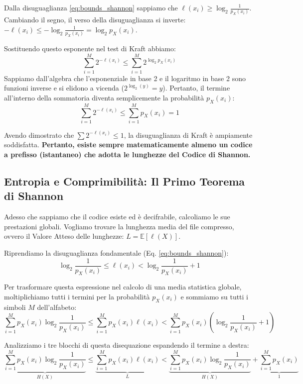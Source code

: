 Dalla disuguaglianza \ref{eq:bounds_shannon} sappiamo che $\ell(x_i) \ge \log_2 \frac{1}{p_X(x_i)}$. 
Cambiando il segno, il verso della disuguaglianza si inverte: 
$-\ell(x_i) \le -\log_2 \frac{1}{p_X(x_i)} = \log_2 p_X(x_i)$.

Sostituendo questo esponente nel test di Kraft abbiamo:
\begin{equation}
\sum_{i=1}^{M} 2^{-\ell(x_i)} \le \sum_{i=1}^{M} 2^{\log_2 p_X(x_i)}
\end{equation}
Sappiamo dall'algebra che l'esponenziale in base 2 e il logaritmo in base 2 sono funzioni inverse e si elidono a vicenda ($2^{\log_2(y)} = y$). Pertanto, il termine all'interno della sommatoria diventa semplicemente la probabilità $p_X(x_i)$:
\begin{equation}
\sum_{i=1}^{M} 2^{-\ell(x_i)} \le \sum_{i=1}^{M} p_X(x_i) = 1
\end{equation}

Avendo dimostrato che $\sum 2^{-\ell(x_i)} \le 1$, la disuguaglianza di Kraft è ampiamente soddisfatta. \textbf{Pertanto, esiste sempre matematicamente almeno un codice a prefisso (istantaneo) che adotta le lunghezze del Codice di Shannon.}

\subsection{Entropia e Comprimibilità: Il Primo Teorema di Shannon}

Adesso che sappiamo che il codice esiste ed è decifrabile, calcoliamo le sue prestazioni globali. Vogliamo trovare la lunghezza media del file compresso, ovvero il Valore Atteso delle lunghezze: $L = \mathbb{E}[\ell(X)]$.

Riprendiamo la disuguaglianza fondamentale (Eq. \ref{eq:bounds_shannon}):
\begin{equation*}
\log_2 \frac{1}{p_X(x_i)} \le \ell(x_i) < \log_2 \frac{1}{p_X(x_i)} + 1
\end{equation*}

Per trasformare questa espressione nel calcolo di una media statistica globale, moltiplichiamo tutti i termini per la probabilità $p_X(x_i)$ e sommiamo su tutti i simboli $M$ dell'alfabeto:
\begin{equation}
\sum_{i=1}^{M} p_X(x_i) \log_2 \frac{1}{p_X(x_i)} \le \sum_{i=1}^{M} p_X(x_i) \ell(x_i) < \sum_{i=1}^{M} p_X(x_i) \left( \log_2 \frac{1}{p_X(x_i)} + 1 \right)
\end{equation}

Analizziamo i tre blocchi di questa disequazione espandendo il termine a destra:
\begin{equation}
\underbrace{\sum_{i=1}^{M} p_X(x_i) \log_2 \frac{1}{p_X(x_i)}}_{H(X)} \le \underbrace{\sum_{i=1}^{M} p_X(x_i) \ell(x_i)}_{L} < \underbrace{\sum_{i=1}^{M} p_X(x_i) \log_2 \frac{1}{p_X(x_i)}}_{H(X)} + \underbrace{\sum_{i=1}^{M} p_X(x_i)}_{1}
\end{equation}

